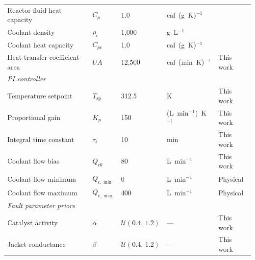 \documentclass[aps,pre,twocolumn,superscriptaddress,floatfix]{revtex4-2}
\begin{document}
\begin{table}[tb]
\begin{tabular}{lllll}
Reactor fluid heat capacity & $C_p$         & 1.0                  & cal~(g~K)$^{-1}$      & \citet{PerrysHandbook} \\
Coolant density            & $\rho_c$       & 1{,}000              & g~L$^{-1}$            & \citet{PerrysHandbook} \\
Coolant heat capacity      & $C_{pc}$       & 1.0                  & cal~(g~K)$^{-1}$      & \citet{PerrysHandbook} \\
Heat transfer coefficient-area & $U\!A$     & 12{,}500             & cal~(min~K)$^{-1}$    & This work \\
\midrule
\multicolumn{5}{l}{\textit{PI controller}} \\
Temperature setpoint       & $T_\mathrm{sp}$ & 312.5               & K                     & This work \\
Proportional gain          & $K_p$          & 150                  & (L~min$^{-1}$)~K$^{-1}$ & This work \\
Integral time constant     & $\tau_i$       & 10                   & min                   & This work \\
Coolant flow bias          & $Q_{c0}$       & 80                   & L~min$^{-1}$          & This work \\
Coolant flow minimum       & $Q_{c,\min}$   & 0                    & L~min$^{-1}$          & Physical \\
Coolant flow maximum       & $Q_{c,\max}$   & 400                  & L~min$^{-1}$          & Physical \\
\midrule
\multicolumn{5}{l}{\textit{Fault parameter priors}} \\
Catalyst activity          & $\alpha$       & $\mathcal{U}(0.4,\,1.2)$ & — & This work \\
Jacket conductance         & $\beta$        & $\mathcal{U}(0.4,\,1.2)$ & — & This work \\
\hline
\bottomrule
\end{tabular}
\end{table}
\end{document}
